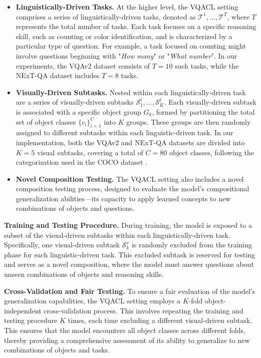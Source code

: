 \begin{itemize}
    \item \textbf{Linguistically-Driven Tasks. }At the higher level, the VQACL setting comprises a series of linguistically-driven tasks, denoted as ${\mathcal{T}^1, \dots, \mathcal{T}^T}$, where $T$ represents the total number of tasks. Each task focuses on a specific reasoning skill, such as counting or color identification, and is characterized by a particular type of question. For example, a task focused on counting might involve questions beginning with "\textit{How many}" or "\textit{What number}". In our experiments, the VQAv2 dataset consists of $T\!=\!10$ such tasks, while the NExT-QA dataset includes $T\!=\!8$ tasks.

    \item \textbf{Visually-Driven Subtasks. }Nested within each linguistically-driven task are a series of visually-driven subtasks ${\mathcal{S}_1^t, \dots, \mathcal{S}_K^t}$. Each visually-driven subtask is associated with a specific object group $G_k$, formed by partitioning the total set of object classes ${\{c_i}\}_{i=1}^{C}$ into $K$ groups. These groups are then randomly assigned to different subtasks within each linguistic-driven task. In our implementation, both the VQAv2 and NExT-QA datasets are divided into $K\!=\!5$ visual subtasks, covering a total of $C\!=\!80$ object classes, following the categorization used in the COCO dataset \citep{cocodataset}.

    \item \textbf{Novel Composition Testing. }The VQACL setting also includes a novel composition testing process, designed to evaluate the model's compositional generalization abilities—its capacity to apply learned concepts to new combinations of objects and questions.
\end{itemize}

\noindent\textbf{Training and Testing Procedure.} During training, the model is exposed to a subset of the visual-driven subtasks within each linguistically-driven task. Specifically, one visual-driven subtask $\mathcal{S}_k^v$ is randomly excluded from the training phase for each linguistic-driven task. This excluded subtask is reserved for testing and serves as a novel composition, where the model must answer questions about unseen combinations of objects and reasoning skills.

\noindent\textbf{Cross-Validation and Fair Testing. }To ensure a fair evaluation of the model's generalization capabilities, the VQACL setting employs a $K$-fold object-independent cross-validation process. This involves repeating the training and testing procedure $K$ times, each time excluding a different visual-driven subtask. This ensures that the model encounters all object classes across different folds, thereby providing a comprehensive assessment of its ability to generalize to new combinations of objects and tasks.

